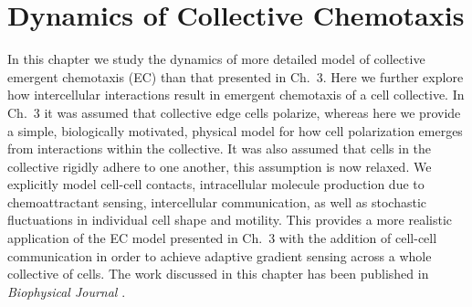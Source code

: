 
\chapter{Dynamics of Collective Chemotaxis}

\noindent
In this chapter we study the dynamics of more detailed model of collective emergent chemotaxis (EC) than that presented in Ch.\ 3.
Here we further explore how intercellular interactions result in emergent chemotaxis of a cell collective. In Ch.\ 3 it was assumed that collective edge cells polarize, whereas here we provide a simple, biologically motivated, physical model for how cell polarization emerges from interactions within the collective. It was also assumed that cells in the collective rigidly adhere to one another, this assumption is now relaxed. We explicitly model cell-cell contacts, intracellular molecule production due to chemoattractant sensing, intercellular communication, as well as stochastic fluctuations in individual cell shape and motility.
This provides a more realistic application of the EC model presented in Ch.\ 3 with the addition of cell-cell communication in order to achieve adaptive gradient sensing across a whole collective of cells. The work discussed in this chapter has been published in \textit{Biophysical Journal} \cite{varennes2016collective}.

